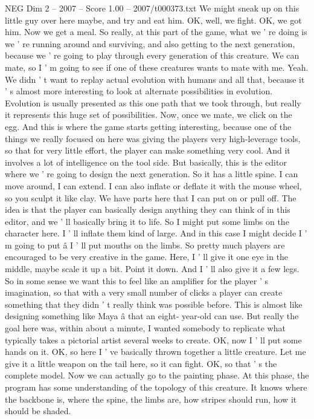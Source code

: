 \begin{textsample}{NEG Dim 2 – 2007 – Score 1.00 – 2007/t000373.txt}
We might sneak up on this little guy over here maybe, and try and eat him.
OK, well, we fight.
OK, we got him.
Now we get a meal.
So really, at this part of the game, what we ' re doing is we ' re running around and surviving, and also getting to the next generation, because we ' re going to play through every generation of this creature.
We can mate, so I ' m going to see if one of these creatures wants to mate with me.
Yeah.
We didn ' t want to replay actual evolution with humans and all that, because it ' s almost more interesting to look at alternate possibilities in evolution.
Evolution is usually presented as this one path that we took through, but really it represents this huge set of possibilities.
Now, once we mate, we click on the egg.
And this is where the game starts getting interesting, because one of the things we really focused on here was giving the players very high-leverage tools, so that for very little effort, the player can make something very cool.
And it involves a lot of intelligence on the tool side.
But basically, this is the editor where we ' re going to design the next generation.
So it has a little spine.
I can move around, I can extend.
I can also inflate or deflate it with the mouse wheel, so you sculpt it like clay.
We have parts here that I can put on or pull off.
The idea is that the player can basically design anything they can think of in this editor, and we ' ll basically bring it to life.
So I might put some limbs on the character here.
I ' ll inflate them kind of large.
And in this case I might decide I ' m going to put â I ' ll put mouths on the limbs.
So pretty much players are encouraged to be very creative in the game.
Here, I ' ll give it one eye in the middle, maybe scale it up a bit.
Point it down.
And I ' ll also give it a few legs.
So in some sense we want this to feel like an amplifier for the player ' s imagination, so that with a very small number of clicks a player can create something that they didn ' t really think was possible before.
This is almost like designing something like Maya â that an eight- year-old can use.
But really the goal here was, within about a minute, I wanted somebody to replicate what typically takes a pictorial artist several weeks to create.
OK, now I ' ll put some hands on it.
OK, so here I ' ve basically thrown together a little creature.
Let me give it a little weapon on the tail here, so it can fight.
OK, so that ' s the complete model.
Now we can actually go to the painting phase.
At this phase, the program has some understanding of the topology of this creature.
It knows where the backbone is, where the spine, the limbs are, how stripes should run, how it should be shaded.

\end{textsample}
